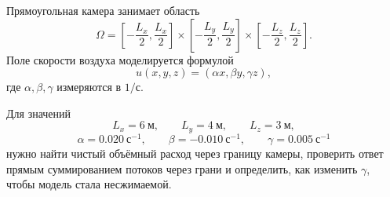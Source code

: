 \begin{problem}
Прямоугольная камера занимает область
\[
\Omega=
\left[-\frac{L_x}{2},\frac{L_x}{2}\right]
\times
\left[-\frac{L_y}{2},\frac{L_y}{2}\right]
\times
\left[-\frac{L_z}{2},\frac{L_z}{2}\right].
\]
Поле скорости воздуха моделируется формулой
\[
u(x,y,z)=(\alpha x,\beta y,\gamma z),
\]
где $\alpha,\beta,\gamma$ измеряются в $1/\text{с}$.

Для значений
\[
L_x=6\ \text{м},
\qquad
L_y=4\ \text{м},
\qquad
L_z=3\ \text{м},
\]
\[
\alpha=0.020\ \text{с}^{-1},
\qquad
\beta=-0.010\ \text{с}^{-1},
\qquad
\gamma=0.005\ \text{с}^{-1}
\]
нужно найти чистый объёмный расход через границу камеры, проверить ответ прямым суммированием потоков через грани и определить, как изменить $\gamma$, чтобы модель стала несжимаемой.
\end{problem}

